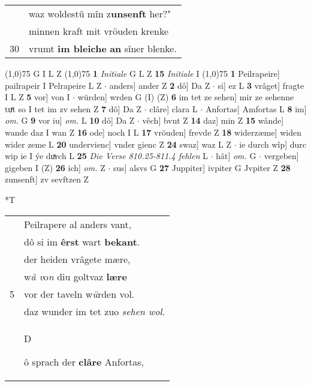 \documentclass[8pt,a4paper,notitlepage]{article}
\begin{document}
\begin{table}[ht]
\begin{minipage}[t]{0.5\linewidth}
\begin{tabular}{rl}
 & waz woldestû mîn z\textbf{unsenft} her?"\\ 
 & minnen kraft mit vröuden krenke\\ 
30 & vrumt \textbf{im bleiche} \textbf{an} sîner blenke.\\ 
\end{tabular}
\scriptsize
\line(1,0){75} \newline
G I L Z \newline
\line(1,0){75} \newline
\textbf{1} \textit{Initiale} G L Z  \textbf{15} \textit{Initiale} I  \newline
\line(1,0){75} \newline
\textbf{1} Peilrapeire] pailrapeir I Pelrapeire L Z  $\cdot$ anders] ander Z \textbf{2} dô] Da Z  $\cdot$ si] ez L \textbf{3} vrâget] fragte I L Z \textbf{5} vor] von I  $\cdot$ würden] wrden G (I) (Z) \textbf{6} im tet ze sehen] mir ze sehenne tuͤt so I tet im zv sehen Z \textbf{7} dô] Da Z  $\cdot$ clâre] clara L  $\cdot$ Anfortas] Amfortas L \textbf{8} im] \textit{om.} G \textbf{9} vor iu] \textit{om.} L \textbf{10} dô] Da Z  $\cdot$ vêch] bvnt Z \textbf{14} daz] min Z \textbf{15} wânde] wande daz I wan Z \textbf{16} ode] noch I L \textbf{17} vröuden] frevde Z \textbf{18} widerzæme] widen wider zeme L \textbf{20} undervienc] vnder gienc Z \textbf{24} swaz] waz L Z  $\cdot$ ie durch wîp] durc wip ie I ýe duͯrch L \textbf{25} \textit{Die Verse 810.25-811.4 fehlen} L   $\cdot$ hât] \textit{om.} G  $\cdot$ vergeben] gigeben I (Z) \textbf{26} ich] \textit{om.} Z  $\cdot$ sus] alsvs G \textbf{27} Juppiter] ivpiter G Jvpiter Z \textbf{28} zunsenft] zv sevftzen Z \newline
\end{minipage}
\hspace{0.5cm}
\begin{minipage}[t]{0.5\linewidth}
\small
\begin{center}*T
\end{center}
\begin{tabular}{rl}
 & Peilrapere al anders vant,\\ 
 & dô si im \textbf{êrst} wart \textbf{bekant}.\\ 
 & der heiden vrâgete mære,\\ 
 & w\textit{â v}o\textit{n} diu goltvaz \textbf{lære}\\ 
5 & vor der taveln w\textit{ü}rden vol.\\ 
 & daz wunder im tet zuo \textit{sehen wol}.\\ 
 & \begin{large}D\end{large}ô sprach der \textbf{clâre} Anfortas,\\ 

\end{tabular}
\end{minipage}
\end{table}
\end{document}
